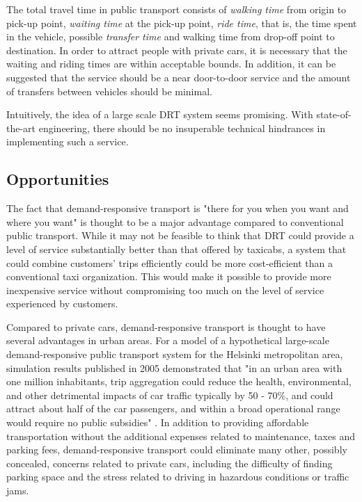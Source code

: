 \documentclass[dissertation,draft*]{aaltoseries}
\begin{document}
The total travel time in public transport consists of
\emph{walking time} from origin to pick-up point, \emph{waiting time} at
the pick-up point, \emph{ride time}, that is, the time spent in the
vehicle, possible \emph{transfer time} and walking time from 
drop-off point to destination. In order %
to attract people with private cars, it is necessary that the waiting and 
riding times are within acceptable bounds. In addition, it can be suggested that
the service should be a near door-to-door service and the amount of
transfers between vehicles should be minimal. 

Intuitively, the idea of a large scale DRT system seems promising.
With state-of-the-art engineering, there should be no insuperable technical hindrances
in implementing such a service.


\subsection{Opportunities}
The fact that demand-responsive transport is "there for you when you want
and where you want" is thought to be a major advantage compared to conventional 
public transport. While it may not be feasible to think that DRT could provide
a level of service substantially better than that offered by taxicabs, a system that could combine customers'
trips efficiently could be more cost-efficient than a conventional taxi organization.
This would make it possible to provide more inexpensive service without compromising
too much on the level of service experienced by customers.

Compared to private cars, demand-responsive transport is thought to have several advantages in urban areas.
For a model of a hypothetical large-scale demand-responsive public transport system for the Helsinki 
metropolitan area, simulation results published in 2005 demonstrated that "in an urban area with one 
million inhabitants, trip aggregation could reduce the health, environmental, and other detrimental 
impacts of car traffic typically by 50 - 70\%, and could attract about half of the car 
passengers, and within a broad operational range would require no public subsidies" \cite{tuomisto}. 
In addition to providing affordable transportation without the additional expenses related 
to maintenance, taxes and parking fees, 
demand-responsive transport could eliminate many other, possibly concealed, concerns related to private cars, 
including the difficulty of finding parking space and the stress related to
driving in hazardous conditions or traffic jams.
\end{document}
